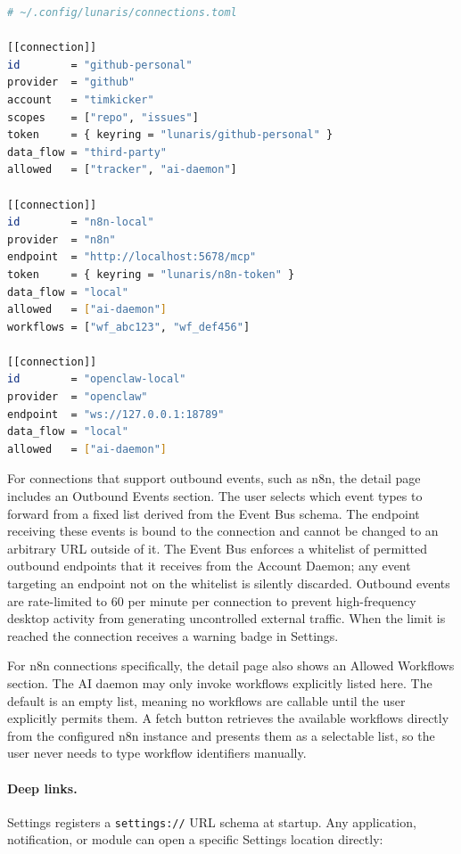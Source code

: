 \begin{lstlisting}[language=bash, caption={Example connection configuration}]
# ~/.config/lunaris/connections.toml

[[connection]]
id        = "github-personal"
provider  = "github"
account   = "timkicker"
scopes    = ["repo", "issues"]
token     = { keyring = "lunaris/github-personal" }
data_flow = "third-party"
allowed   = ["tracker", "ai-daemon"]

[[connection]]
id        = "n8n-local"
provider  = "n8n"
endpoint  = "http://localhost:5678/mcp"
token     = { keyring = "lunaris/n8n-token" }
data_flow = "local"
allowed   = ["ai-daemon"]
workflows = ["wf_abc123", "wf_def456"]

[[connection]]
id        = "openclaw-local"
provider  = "openclaw"
endpoint  = "ws://127.0.0.1:18789"
data_flow = "local"
allowed   = ["ai-daemon"]
\end{lstlisting}

For connections that support outbound events, such as n8n, the detail page
includes an Outbound Events section. The user selects which event types to
forward from a fixed list derived from the Event Bus schema. The endpoint
receiving these events is bound to the connection and cannot be changed to an
arbitrary URL outside of it. The Event Bus enforces a whitelist of permitted
outbound endpoints that it receives from the Account Daemon; any event
targeting an endpoint not on the whitelist is silently discarded. Outbound
events are rate-limited to 60 per minute per connection to prevent high-frequency
desktop activity from generating uncontrolled external traffic. When the limit
is reached the connection receives a warning badge in Settings.

For n8n connections specifically, the detail page also shows an Allowed
Workflows section. The AI daemon may only invoke workflows explicitly listed
here. The default is an empty list, meaning no workflows are callable until
the user explicitly permits them. A fetch button retrieves the available
workflows directly from the configured n8n instance and presents them as a
selectable list, so the user never needs to type workflow identifiers manually.

\paragraph{Deep links.}
\label{sec:settings-deeplinks}
Settings registers a \texttt{settings://} URL schema at startup. Any
application, notification, or module can open a specific Settings location
directly:


